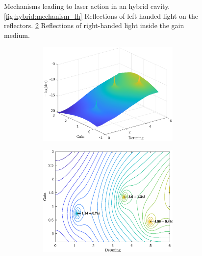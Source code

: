 \begin{figure}
\begin{subfigure}{0.48\linewidth}
		\caption{}
		\label{fig:hybrid:mechanism_rh}
	\end{subfigure}
	\caption[Mechanisms leading to laser action in an hybrid cavity]{Mechanisms leading to laser action in an hybrid cavity. \ref{fig:hybrid:mechanism_lh} Reflections of left-handed light on the reflectors. \ref{fig:hybrid:mechanism_rh} Reflections of right-handed light inside the gain medium.}
	
\end{figure}

\begin{figure}
	\centering
	\begin{subfigure}{0.49\textwidth}
		\begin{subfigure}{\textwidth}
			\includegraphics[width=\textwidth]{plots/hybrid/surface}
			\caption{}
			\label{fig:hybrid_cavity:mycwt_surf}
		\end{subfigure}	
		\begin{subfigure}{\textwidth}
			\includegraphics[width=\textwidth]{plots/hybrid/contour}

\end{subfigure}
\end{subfigure}
\end{figure}
